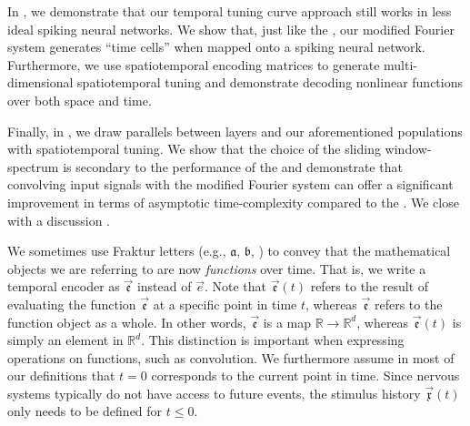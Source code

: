 In , we demonstrate that our temporal tuning curve approach still works in less ideal spiking neural networks.
We show that, just like the \LDN, our modified Fourier system generates \enquote{time cells} when mapped onto a spiking neural network.
Furthermore, we use spatiotemporal encoding matrices to generate multi-dimensional spatiotemporal tuning and demonstrate decoding nonlinear functions over both space and time.

Finally, in , we draw parallels between \LMU layers and our aforementioned \NEF populations with spatiotemporal tuning.
We show that the choice of the sliding window-spectrum is secondary to the performance of the \LMU and demonstrate that convolving input signals with the modified Fourier system can offer a significant improvement in terms of asymptotic time-complexity compared to the \LDN.
We close with a discussion .

\begin{Notation}
We sometimes use Fraktur letters (e.g., $\mathfrak{a}$, $\mathfrak{b}$, \textellipsis) to convey that the mathematical objects we are referring to are now \emph{functions} over time.
That is, we write a temporal encoder as $\vec{\mathfrak{e}}$ instead of $\vec e$.
Note that $\vec{\mathfrak{e}}(t)$ refers to the result of evaluating the function $\vec{\mathfrak{e}}$ at a specific point in time $t$, whereas $\vec{\mathfrak{e}}$ refers to the function object as a whole.
In other words, $\vec{\mathfrak{e}}$ is a map $\mathbb{R} \longrightarrow \mathbb{R}^d$, whereas $\vec{\mathfrak{e}}(t)$ is simply an element in $\mathbb{R}^d$.
This distinction is important when expressing operations on functions, such as convolution.
We furthermore assume in most of our definitions that $t = 0$ corresponds to the current point in time.
Since nervous systems typically do not have access to future events, the stimulus history $\vec{\mathfrak{x}}(t)$ only needs to be defined for $t \leq 0$.
\end{Notation}
